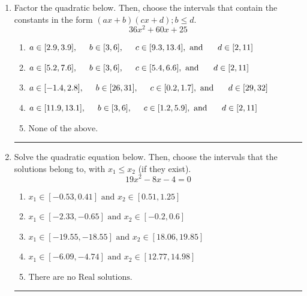 \documentclass[14pt]{extbook}
\newcommand{\litem}[1]{\item#1\hspace*{-1cm}\rule{\textwidth}{0.4pt}}
\begin{document}
\begin{enumerate}
{\begin{enumerate}[label=\Alph*.]
\end{enumerate} }
\litem{
Factor the quadratic below. Then, choose the intervals that contain the constants in the form $(ax+b)(cx+d); b \leq d.$\[ 36x^{2} +60 x + 25 \]\begin{enumerate}[label=\Alph*.]
\item \( a \in [2.9, 3.9], \hspace*{5mm} b \in [3, 6], \hspace*{5mm} c \in [9.3, 13.4], \text{ and } \hspace*{5mm} d \in [2, 11] \)
\item \( a \in [5.2, 7.6], \hspace*{5mm} b \in [3, 6], \hspace*{5mm} c \in [5.4, 6.6], \text{ and } \hspace*{5mm} d \in [2, 11] \)
\item \( a \in [-1.4, 2.8], \hspace*{5mm} b \in [26, 31], \hspace*{5mm} c \in [0.2, 1.7], \text{ and } \hspace*{5mm} d \in [29, 32] \)
\item \( a \in [11.9, 13.1], \hspace*{5mm} b \in [3, 6], \hspace*{5mm} c \in [1.2, 5.9], \text{ and } \hspace*{5mm} d \in [2, 11] \)
\item \( \text{None of the above.} \)

\end{enumerate} }
\litem{
Solve the quadratic equation below. Then, choose the intervals that the solutions belong to, with $x_1 \leq x_2$ (if they exist).\[ 19x^{2} -8 x -4 = 0 \]\begin{enumerate}[label=\Alph*.]
\item \( x_1 \in [-0.53, 0.41] \text{ and } x_2 \in [0.51, 1.25] \)
\item \( x_1 \in [-2.33, -0.65] \text{ and } x_2 \in [-0.2, 0.6] \)
\item \( x_1 \in [-19.55, -18.55] \text{ and } x_2 \in [18.06, 19.85] \)
\item \( x_1 \in [-6.09, -4.74] \text{ and } x_2 \in [12.77, 14.98] \)
\item \( \text{There are no Real solutions.} \)


\end{enumerate}}
\end{enumerate}
\end{document}
